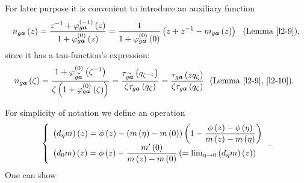 \documentclass[a4paper]{article}%
\begin{document}
For later purpose it is convenient to introduce an auxiliary function%
\begin{equation}
n_{g\boldsymbol{a}}\left(  z\right)  =\dfrac{z^{-1}+\varphi_{g\boldsymbol{a}%
}^{\left(  -1\right)  }\left(  z\right)  }{1+\varphi_{g\boldsymbol{a}%
}^{\left(  0\right)  }\left(  z\right)  }=\dfrac{1}{1+\varphi_{g\boldsymbol{a}%
}^{\left(  0\right)  }\left(  0\right)  }\left(  z+z^{-1}-m_{g\boldsymbol{a}%
}\left(  z\right)  \right)  \text{ \ (Lemma \ref{l2-9}),} \label{2-26}%
\end{equation}
since it has a tau-function's expression:%
\begin{equation}
n_{g\boldsymbol{a}}\left(  \zeta\right)  =\dfrac{1+\varphi_{\widetilde
{g\boldsymbol{a}}}^{\left(  0\right)  }\left(  \zeta^{-1}\right)  }%
{\zeta\left(  1+\varphi_{g\boldsymbol{a}}^{\left(  0\right)  }\left(
\zeta\right)  \right)  }=\dfrac{\tau_{\widetilde{g\boldsymbol{a}}}\left(
q_{\zeta^{-1}}\right)  }{\zeta\tau_{g\boldsymbol{a}}\left(  q_{\zeta}\right)
}=\dfrac{\tau_{g\boldsymbol{a}}\left(  zq_{\zeta}\right)  }{\zeta
\tau_{g\boldsymbol{a}}\left(  q_{\zeta}\right)  }\text{ \ (Lemma \ref{l2-9},
\ref{l2-10}). } \label{2-27}%
\end{equation}


For simplicity of notation we define an operation%
\begin{equation}
\left\{
\begin{array}
[c]{l}%
\left(  d_{\eta}m\right)  \left(  z\right)  =\phi\left(  z\right)  -\left(
m\left(  \eta\right)  -m\left(  0\right)  \right)  \left(  1-\dfrac
{\phi\left(  z\right)  -\phi\left(  \eta\right)  }{m\left(  z\right)
-m\left(  \eta\right)  }\right) \\
\left(  d_{0}m\right)  \left(  z\right)  =\phi\left(  z\right)  -\dfrac
{m^{\prime}\left(  0\right)  }{m\left(  z\right)  -m\left(  0\right)  }\left(
=\lim_{\eta\rightarrow0}\left(  d_{\eta}m\right)  \left(  z\right)  \right)
\end{array}
\right.  \text{.} \label{2-28}%
\end{equation}
One can show
\end{document}
